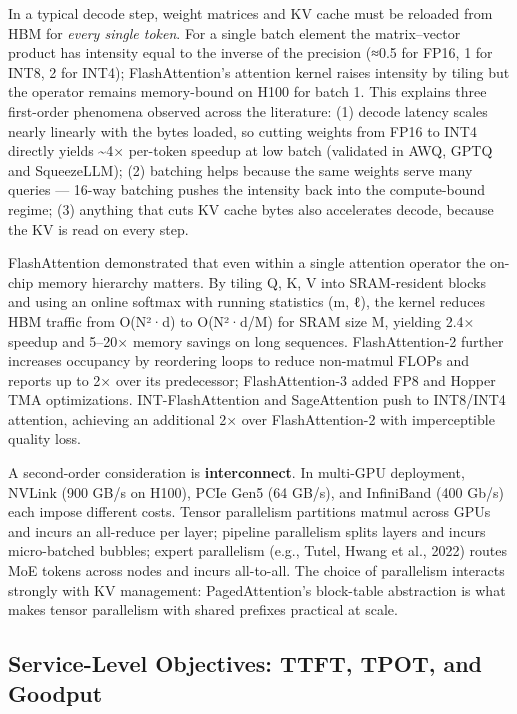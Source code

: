 \documentclass{article}
\begin{document}
In a typical decode step, weight matrices and KV cache must be reloaded from HBM for \emph{every single token}. For a single batch element the matrix--vector product has intensity equal to the inverse of the precision (≈0.5 for FP16, 1 for INT8, 2 for INT4); FlashAttention's attention kernel raises intensity by tiling but the operator remains memory-bound on H100 for batch 1. This explains three first-order phenomena observed across the literature: (1) decode latency scales nearly linearly with the bytes loaded, so cutting weights from FP16 to INT4 directly yields \textasciitilde4× per-token speedup at low batch (validated in AWQ, GPTQ and SqueezeLLM); (2) batching helps because the same weights serve many queries --- 16-way batching pushes the intensity back into the compute-bound regime; (3) anything that cuts KV cache bytes also accelerates decode, because the KV is read on every step.

FlashAttention \citep{dao20222022} demonstrated that even within a single attention operator the on-chip memory hierarchy matters. By tiling Q, K, V into SRAM-resident blocks and using an online softmax with running statistics (m, ℓ), the kernel reduces HBM traffic from O(N²·d) to O(N²·d/M) for SRAM size M, yielding 2.4× speedup and 5--20× memory savings on long sequences. FlashAttention-2 \citep{dao2024flashattention2fas} further increases occupancy by reordering loops to reduce non-matmul FLOPs and reports up to 2× over its predecessor; FlashAttention-3 added FP8 and Hopper TMA optimizations. INT-FlashAttention \citep{chen20242024} and SageAttention \citep{zhang20242024} push to INT8/INT4 attention, achieving an additional 2× over FlashAttention-2 with imperceptible quality loss.

A second-order consideration is \textbf{interconnect}. In multi-GPU deployment, NVLink (900 GB/s on H100), PCIe Gen5 (64 GB/s), and InfiniBand (400 Gb/s) each impose different costs. Tensor parallelism partitions matmul across GPUs and incurs an all-reduce per layer; pipeline parallelism splits layers and incurs micro-batched bubbles; expert parallelism (e.g., Tutel, Hwang et al., 2022) routes MoE tokens across nodes and incurs all-to-all. The choice of parallelism interacts strongly with KV management: PagedAttention's block-table abstraction is what makes tensor parallelism with shared prefixes practical at scale.

\subsection{Service-Level Objectives: TTFT, TPOT, and Goodput}\label{service-level-objectives-ttft-tpot-and-goodput}
\end{document}
